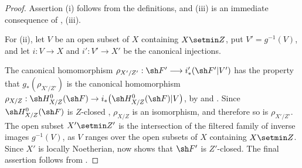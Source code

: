 \begin{proof}
Assertion {\rm(i)} follows from the definitions, and {\rm(iii)}
is an immediate consequence of , {\rm(iii)}.

For {\rm(ii)}, let $V$ be an open subset of $X$ containing
$X\setmin Z$, put $V'=g^{-1}(V)$, and let
$i:V\to X$ and $i':V'\to X'$ be the canonical injections.


The canonical homomorphism $\rho_{X'/Z'}:\sh F'\longrightarrow i'_*(\sh F'|V')$
has the property that $g_*(\rho_{X'/Z'})$ is the canonical
homomorphism $\rho_{X/Z}:\sh H^0_{X/Z}(\sh F)
\to i_*\bigl(\sh H^0_{X/Z}(\sh F)|V\bigr)$,
by  and .
Since $\sh H^0_{X/Z}(\sh F)$ is $Z$-closed
, $\rho_{X/Z}$ is an isomorphism, and therefore
so is $\rho_{X'/Z'}$.  The open subset $X'\setmin Z'$ is the
intersection of the filtered family of inverse images
$g^{-1}(V)$, as $V$ ranges over the open subsets of $X$
containing $X\setmin Z$.  Since $X'$ is locally Noetherian,
 now shows that $\sh F'$ is $Z'$-closed.
The final assertion follows from .
\end{proof}
